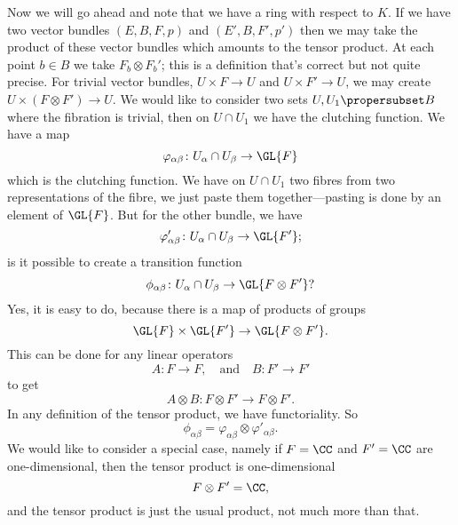 Now we will go ahead and note that we have a ring with respect to
$K$. If we have two vector bundles $(E,B,F,p)$ and
$(E',B,F',p')$ then we may take the product of these vector
bundles which amounts to the tensor product. At each point $b\in
B$ we take $F_{b}\otimes F_{b}'$; this is a definition that's
correct but not quite precise. For trivial vector bundles,
$U\times F\to U$ and $U\times F'\to U$, we may create
$U\times(F\otimes F')\to U$. We would like to consider two sets
$U,U_{1}\propersubset B$ where the fibration is trivial, then on
$U\cap U_{1}$ we have the clutching function. We have a map
\begin{equation}
\varphi_{\alpha\beta}\colon U_{\alpha}\cap U_{\beta}\to\GL{F}
\end{equation}
which is the clutching function. We have on $U\cap U_{1}$ two
fibres from two representations of the fibre, we just paste them
together---pasting is done by an element of $\GL{F}$. But for the
other bundle, we have
\begin{equation}
\varphi'_{\alpha\beta}\colon U_{\alpha}\cap U_{\beta}\to\GL{F'};
\end{equation}
is it possible to create a transition
function
\begin{equation}
\phi_{\alpha\beta}\colon U_{\alpha}\cap U_{\beta}\to\GL{F\otimes F'}?
\end{equation}
Yes, it is easy to do, because there is a map of products of
groups
\begin{equation}
\GL{F}\times\GL{F'}\to\GL{F\otimes F'}.
\end{equation}
This can be done for any linear operators
\begin{equation}
A\colon F\to F,\quad\mbox{and}\quad B\colon F'\to F'
\end{equation}
to get
\begin{equation}
A\otimes B\colon F\otimes F'\to F\otimes F'.
\end{equation}
In any definition of the tensor product, we have
functoriality. So 
\begin{equation}
\phi_{\alpha\beta}=\varphi_{\alpha\beta}\otimes\varphi'_{\alpha\beta}.
\end{equation}
We would like to consider a special case, namely if $F=\CC$ and
$F'=\CC$ are one-dimensional, then the tensor product is
one-dimensional
\begin{equation}
F\otimes F'=\CC,
\end{equation}
and the tensor product is just the usual product, not much more
than that.


